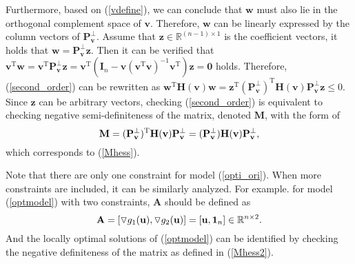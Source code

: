 \documentclass{elsarticle}
\begin{document}
Furthermore,  based on  (\ref{vdefine}), we  can  conclude  that  $   \mathbf w$  must  also  lie  in  the  orthogonal complement space of $ \mathbf  v$. 
Therefore,  $   \mathbf w$ can be linearly expressed  by the column vectors of  $\mathbf  P_{\mathbf  v } ^{\bot}$.
Assume that  $ \mathbf z \in \mathbb R^{(n-1) \times 1} $ is the coefficient vectors, it holds that  
$   \mathbf w   =  \mathbf  P_{\mathbf  v } ^{\bot}  \mathbf  z$.  
Then it can be  verified   that 
$  \mathbf v^{\mathrm T} \mathbf w 
=   \mathbf v^{\mathrm T}   \mathbf  P_{\mathbf  v } ^{\bot}  \mathbf  z
=  
\mathbf v^{\mathrm T} (\mathbf  I_{n} -
\mathbf  v (\mathbf  v^{\mathrm T}\mathbf  v)^{-1} \mathbf  v^{\mathrm T} )
\mathbf  z
= \mathbf  0
$  holds.  
Therefore,   (\ref{second_order}) can be  rewritten as 
$ 	\mathbf w^{\mathrm T}\mathbf H (\mathbf v) \mathbf w  
=
\mathbf  z^{\mathrm T}    (\mathbf  P_{\mathbf  v } ^{\bot})^{\mathrm T}    \mathbf H (\mathbf v)  \mathbf  P_{\mathbf  v }^{\bot}  \mathbf  z     \le 0 $.
Since  $ \mathbf  z $ can be   arbitrary  vectors,  checking  (\ref{second_order}) 
is equivalent to  checking  negative semi-definiteness    of  the  matrix, denoted  
$\mathbf  M $, with the  form of 
\begin{equation}%
\notag
\mathbf {M} =
(\mathbf  P_{\mathbf  v } ^{\bot})^{\mathrm T}    \mathbf H (\mathbf v)  \mathbf  P_{\mathbf  v }^{\bot}
=
(\mathbf  P_{\mathbf  v } ^{\bot})    \mathbf H (\mathbf v)  \mathbf  P_{\mathbf  v }^{\bot}
,
\end{equation}  
which  
corresponds to 
	(\ref{Mhess}).

Note that 
there are only one constraint for model (\ref{opti_ori}).
When more constraints are included, it can be similarly analyzed. 
For example. 
for    model  (\ref{optmodel}) with two constraints,  $\mathbf A$  should be  defined  as  
\begin{equation}
\notag
\mathbf A =  [\triangledown  g_{1}(\mathbf u) , \triangledown  g_{2}(\mathbf u) ] =
[\mathbf u, \mathbf 1_{n}]  \in   \mathbb R^{n  \times 2 } .
\end{equation}
And 
the 
locally    optimal   solutions of   (\ref{optmodel})
can  be  identified  by
checking the  negative 
definiteness of the   matrix  as  defined  in (\ref{Mhess2}).
%
%




\end{document}
